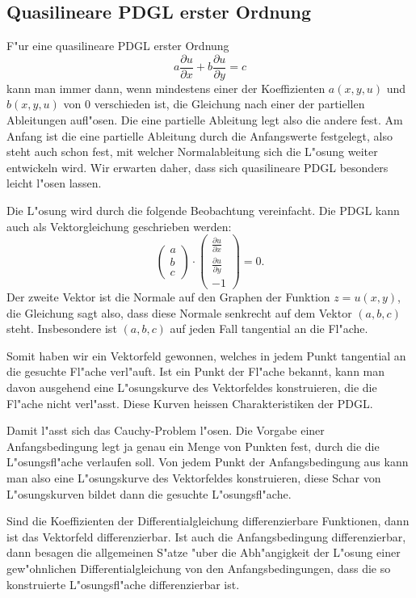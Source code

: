 \subsection{Quasilineare PDGL erster Ordnung}
F"ur eine quasilineare PDGL erster Ordnung
$$
a\frac{\partial u}{\partial x}
+
b\frac{\partial u}{\partial y}
=
c
$$
kann man immer dann, wenn mindestens einer der Koeffizienten
$a(x,y,u)$ und $b(x,y,u)$ von $0$ verschieden ist, die Gleichung
nach einer der partiellen Ableitungen aufl"osen. Die eine partielle
Ableitung legt also die andere fest. Am Anfang ist die eine partielle
Ableitung durch die Anfangswerte festgelegt, also steht auch schon fest,
mit welcher Normalableitung sich die L"osung weiter entwickeln wird.
Wir erwarten daher, dass sich quasilineare PDGL besonders leicht
l"osen lassen.

Die L"osung wird durch die folgende Beobachtung vereinfacht.
Die PDGL kann auch als Vektorgleichung geschrieben werden:
$$\begin{pmatrix}a\\b\\c\end{pmatrix}
\cdot
\begin{pmatrix}
\frac{\partial u}{\partial x}\\
\frac{\partial u}{\partial y}\\
-1
\end{pmatrix}=0.
$$
Der zweite Vektor ist die Normale auf den Graphen der Funktion
$z=u(x,y)$, die Gleichung sagt also, dass diese Normale senkrecht
auf dem Vektor $(a,b,c)$ steht. Insbesondere ist $(a,b,c)$ auf
jeden Fall tangential an die Fl"ache.

Somit haben wir ein Vektorfeld gewonnen, welches in jedem Punkt tangential
an die gesuchte Fl"ache verl"auft. Ist ein Punkt der Fl"ache bekannt,
kann man davon ausgehend eine L"osungskurve des Vektorfeldes konstruieren,
die die Fl"ache nicht verl"asst. Diese Kurven heissen Charakteristiken der PDGL.

Damit l"asst sich das Cauchy-Problem l"osen. Die Vorgabe einer Anfangsbedingung
legt ja genau ein Menge von Punkten fest, durch die die L"osungsfl"ache
verlaufen soll. Von jedem Punkt der Anfangsbedingung aus kann man also
eine L"osungskurve des Vektorfeldes konstruieren, diese Schar von L"osungskurven
bildet dann die gesuchte L"osungsfl"ache.

Sind die Koeffizienten der Differentialgleichung differenzierbare Funktionen,
dann ist das Vektorfeld differenzierbar.
Ist auch die Anfangsbedingung differenzierbar,
dann besagen die allgemeinen S"atze "uber die Abh"angigkeit der L"osung einer
gew"ohnlichen Differentialgleichung von den Anfangsbedingungen, dass die so
konstruierte L"osungsfl"ache differenzierbar ist.


